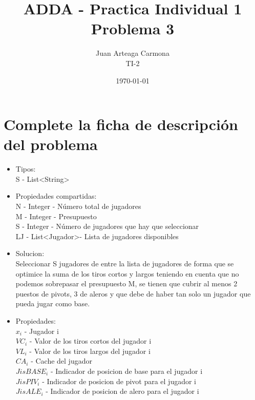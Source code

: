 \documentclass[a4paper,12pt]{article}
\title{ADDA - Practica Individual 1\\ Problema 3}
\author{Juan Arteaga Carmona\\TI-2}
\date{\today}
\begin{document}
\maketitle

\section{Complete la ficha de descripción del problema}


\begin{itemize}
 \item Tipos:\\
 S - List\textless String\textgreater \\%

 \item Propiedades compartidas:\\
 N - Integer - Número total de jugadores\\
 M - Integer - Presupuesto\\
 S - Integer - Número de jugadores que hay que seleccionar\\
 LJ - List\textless Jugador\textgreater - Lista de jugadores disponibles\\
 \item Solucion:\\
Seleccionar S jugadores de entre la lista de jugadores de forma que se optimice
la suma de los tiros cortos y largos teniendo en cuenta que no podemos sobrepasar el presupuesto M, se tienen que cubrir
 al menos 2 puestos de pivots, 3 de aleros y que debe de haber tan solo un jugador
 que pueda jugar como base.


\item Propiedades:\\
\begin{math}
 x_i
\end{math}
- Jugador i\\
\begin{math}
VC_i
\end{math}
- Valor de los tiros cortos del jugador i\\
\begin{math}
VL_i
\end{math}
- Valor de los tiros largos del jugador i\\
 \begin{math}
CA_i
 \end{math}
 - Cache del jugador\\
 \begin{math}
JisBASE_i
 \end{math}
 - Indicador de posicion de base para el jugador i\\
 \begin{math}
JisPIV_i
 \end{math}
 - Indicador de posicion de pivot para el jugador i\\
 \begin{math}
JisALE_i
 \end{math}
 - Indicador de posicion de alero para el jugador i\\



\end{itemize}
\end{document}
